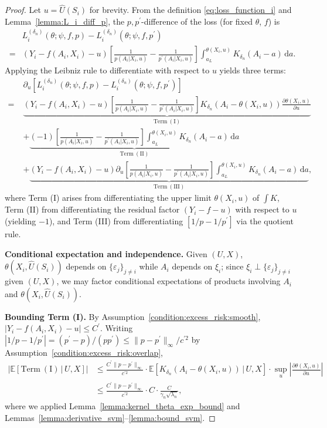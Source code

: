 \documentclass[12pt]{article}
\newcommand{\E}{\mathbb{E}}
\begin{document}
\begin{proof}
Let $u = \widehat{U}(S_i)$ for brevity.  From the definition \eqref{eq:loss_function_i} and Lemma~\ref{lemma:L_i_diff_p}, the $p,p^\prime$-difference of the loss (for fixed $\theta$, $f$) is
\begin{align*}
&L^{(\delta_n)}_i(\theta;\psi,f,p) - L^{(\delta_n)}_i(\theta;\psi,f,p^\prime)\\
= &\left(Y_i - f(A_i,X_i) - u\right)\left[\frac{1}{p(A_i|X_i,u)}-\frac{1}{p^\prime(A_i|X_i,u)}\right]\int_{a_L}^{\theta(X_i,u)}K_{\delta_n}(A_i-a)\,\mathrm{d}a.
\end{align*}
Applying the Leibniz rule to differentiate with respect to $u$ yields three terms:
\begin{align*}
&\partial_u\!\left[L^{(\delta_n)}_i(\theta;\psi,f,p) - L^{(\delta_n)}_i(\theta;\psi,f,p^\prime)\right]\\
=\;&\underbrace{\left(Y_i-f(A_i,X_i)-u\right)\left[\frac{1}{p(A_i|X_i,u)}-\frac{1}{p^\prime(A_i|X_i,u)}\right]K_{\delta_n}(A_i-\theta(X_i,u))\frac{\partial\theta(X_i,u)}{\partial u}}_{\mathrm{Term\ (I)}}\\
&+\underbrace{(-1)\left[\frac{1}{p(A_i|X_i,u)}-\frac{1}{p^\prime(A_i|X_i,u)}\right]\int_{a_L}^{\theta(X_i,u)}K_{\delta_n}(A_i-a)\,\mathrm{d}a}_{\mathrm{Term\ (II)}}\\
&+\underbrace{\left(Y_i-f(A_i,X_i)-u\right)\partial_u\!\left[\frac{1}{p(A_i|X_i,u)}-\frac{1}{p^\prime(A_i|X_i,u)}\right]\int_{a_L}^{\theta(X_i,u)}K_{\delta_n}(A_i-a)\,\mathrm{d}a}_{\mathrm{Term\ (III)}},
\end{align*}
where Term (I) arises from differentiating the upper limit $\theta(X_i,u)$ of $\int K$, Term (II) from differentiating the residual factor $(Y_i-f-u)$ with respect to $u$ (yielding $-1$), and Term (III) from differentiating $[1/p-1/p^\prime]$ via the quotient rule.

\noindent\textbf{Conditional expectation and independence.}
Given $(U,X)$, $\theta(X_i,\widehat{U}(S_i))$ depends on $\{\varepsilon_j\}_{j\neq i}$ while $A_i$ depends on $\xi_i$; since $\xi_i\perp\{\varepsilon_j\}_{j\neq i}$ given $(U,X)$, we may factor conditional expectations of products involving $A_i$ and $\theta(X_i,\widehat{U}(S_i))$.

\noindent\textbf{Bounding Term (I).}
By Assumption~\ref{condition:excess_risk:smooth}, $|Y_i-f(A_i,X_i)-u|\leq C^\prime$.  Writing $|1/p - 1/p^\prime|=(p^\prime-p)/(pp^\prime)\leq \|p-p^\prime\|_\infty/c^{\prime 2}$ by Assumption~\ref{condition:excess_risk:overlap},
\begin{align*}
\left|\E\!\left[\mathrm{Term\ (I)}\,\big|\,U,X\right]\right|
&\leq \frac{C^\prime\|p-p^\prime\|_\infty}{c^{\prime 2}}\cdot\E\!\left[K_{\delta_n}(A_i-\theta(X_i,u))\,\big|\,U,X\right]\cdot\sup_u\left|\frac{\partial\theta(X_i,u)}{\partial u}\right|\\
&\leq \frac{C^\prime\|p-p^\prime\|_\infty}{c^{\prime 2}}\cdot C\cdot\frac{C}{\gamma_n\sqrt{\lambda_n}},
\end{align*}
where we applied Lemma~\ref{lemma:kernel_theta_exp_bound} and Lemmas~\ref{lemma:derivative_svm}--\ref{lemma:bound_svm}.


\end{proof}
\end{document}
